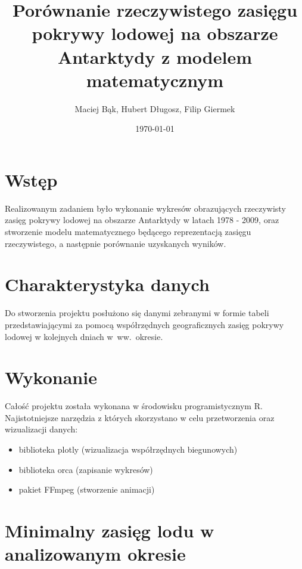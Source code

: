 \documentclass[letterpaper,12pt]{article}
\begin{document}
\pagestyle{plain}

\title{Porównanie rzeczywistego zasięgu pokrywy lodowej na obszarze Antarktydy z modelem matematycznym}
\author{Maciej Bąk, Hubert Długosz, Filip Giermek}
\date{\today}
\maketitle

\section{Wstęp}
Realizowanym zadaniem było wykonanie wykresów obrazujących rzeczywisty zasięg pokrywy lodowej na obszarze Antarktydy w latach 1978 - 2009, oraz stworzenie modelu matematycznego będącego reprezentacją zasięgu rzeczywistego, a następnie porównanie uzyskanych wyników.

\section{Charakterystyka danych}
Do stworzenia projektu posłużono się danymi zebranymi w formie tabeli przedstawiającymi za pomocą współrzędnych geograficznych zasięg pokrywy lodowej w kolejnych dniach w~ww.~okresie.

\section{Wykonanie}
Całość projektu została wykonana w środowisku programistycznym R. Najistotniejsze narzędzia z których skorzystano w celu przetworzenia oraz wizualizacji danych:

\begin{itemize}
  \item biblioteka plotly (wizualizacja współrzędnych biegunowych)
  \item biblioteka orca (zapisanie wykresów)
  \item pakiet FFmpeg (stworzenie animacji)
\end{itemize}

\section{Minimalny zasięg lodu w analizowanym okresie}
\end{document}
